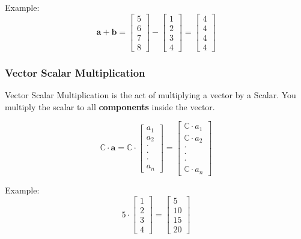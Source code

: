 \documentclass[12pt]{article}
\begin{document}
            Example:
            \begin{equation}
                \mathbf{a + b} =
                    \begin{bmatrix} 5 \\ 6 \\ 7 \\ 8 \end{bmatrix} -
                    \begin{bmatrix} 1 \\ 2 \\ 3 \\ 4 \end{bmatrix} =
                    \begin{bmatrix} 4 \\ 4 \\ 4 \\ 4 \end{bmatrix}
            \end{equation}

        \newpage
        \subsubsection{Vector Scalar Multiplication}
            Vector Scalar Multiplication is the act of multiplying a vector by a Scalar. You multiply the scalar to all \textbf{components} inside the vector.

            \begin{equation}
                \mathbb{C} \cdot \mathbf{a} = \mathbb{C} \cdot
                    \begin{bmatrix} a_1 \\ a_2 \\ \cdot \\ \cdot \\ \cdot \\ a_n \end{bmatrix} =
                    \begin{bmatrix}  \mathbb{C} \cdot a_1 \\  \mathbb{C} \cdot a_2 \\ \cdot \\ \cdot \\ \cdot \\  \mathbb{C} \cdot a_n \end{bmatrix}
            \end{equation}

            Example:
            \begin{equation}
                5 \cdot \begin{bmatrix} 1 \\ 2 \\ 3 \\ 4 \end{bmatrix} =
                \begin{bmatrix} 5 \\ 10 \\ 15 \\ 20 \end{bmatrix}
            \end{equation}
\end{document}
